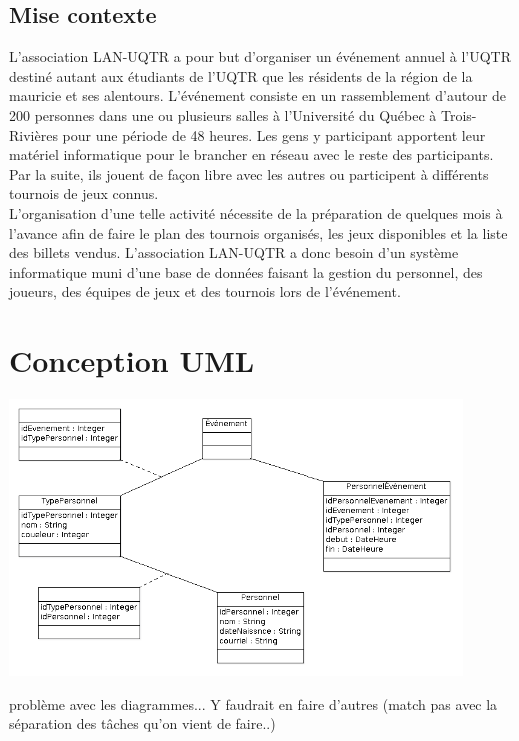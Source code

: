 \documentclass[11pt,french]{article}
\begin{document}
        \subsection*{Mise contexte} %
        \label{sub:mise-en-contexte}
            L'association LAN-UQTR a pour but d'organiser un événement annuel à l'UQTR destiné autant aux
            étudiants de l'UQTR que les résidents de la région de la mauricie et ses alentours. L'événement
            consiste en un rassemblement d'autour de 200 personnes dans une ou plusieurs salles à l'Université
            du Québec à Trois-Rivières pour une période de 48 heures. Les gens y participant apportent leur matériel
            informatique pour le brancher en réseau avec le reste des participants. Par la suite, ils jouent de façon
            libre avec les autres ou participent à différents tournois de jeux connus.\\

            L'organisation d'une telle activité nécessite de la préparation de quelques mois à l'avance afin de faire
            le plan des tournois organisés, les jeux disponibles et la liste des billets vendus. L'association LAN-UQTR
            a donc besoin d'un système informatique muni d'une base de données faisant la gestion du personnel, des joueurs,
            des équipes de jeux et des tournois lors de l'événement.
    \newpage

    \section{Conception UML} %
    \label{sec:concep-uml}
        \includegraphics[width=12cm]{../../conception/conceptionBDevenement.png}

        problème avec les diagrammes... Y faudrait en faire d'autres (match pas avec la séparation des tâches qu'on vient de faire..)
\end{document}
